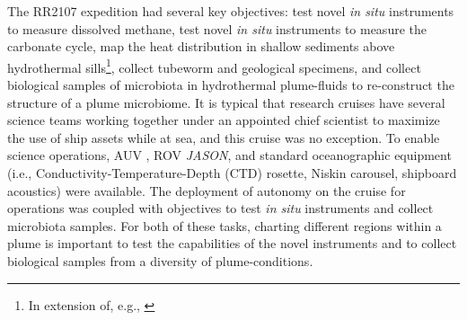 The RR2107 expedition had several key objectives: test novel \emph{in situ} instruments to measure dissolved methane\autocite{kapit2021dissolved,kapit2021measurement,michel2022gas}, test novel \emph{in situ} instruments to measure the carbonate cycle, map the heat distribution in shallow sediments above hydrothermal sills\footnote{In extension of, e.g., \autocite{neumann2022heat}}, collect tubeworm and geological specimens, and collect biological samples of microbiota in hydrothermal plume-fluids to re-construct the structure of a plume microbiome. It is typical that research cruises have several science teams working together under an appointed chief scientist to maximize the use of ship assets while at sea, and this cruise was no exception. To enable science operations, AUV \Sentry, ROV \emph{JASON}, and standard oceanographic equipment (i.e., Conductivity-Temperature-Depth (CTD) rosette, Niskin carousel, shipboard acoustics) were available. The deployment of autonomy on the cruise for \Sentry operations was coupled with objectives to test \emph{in situ} instruments and collect microbiota samples. For both of these tasks, charting different regions within a plume is important to test the capabilities of the novel instruments and to collect biological samples from a diversity of plume-conditions.



